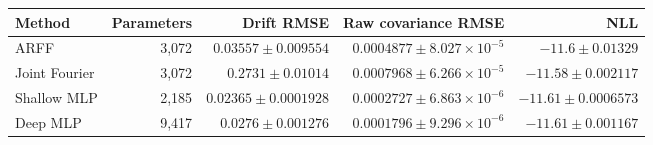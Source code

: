 \begin{tabular}{lrrrr}\toprule Method & Parameters & Drift RMSE & Raw covariance RMSE & NLL\\\midrule
ARFF & 3,072 & $0.03557\pm 0.009554$ & $0.0004877\pm 8.027\times10^{-5}$ & $-11.6\pm 0.01329$\\
Joint Fourier & 3,072 & $0.2731\pm 0.01014$ & $0.0007968\pm 6.266\times10^{-5}$ & $-11.58\pm 0.002117$\\
Shallow MLP & 2,185 & $0.02365\pm 0.0001928$ & $0.0002727\pm 6.863\times10^{-6}$ & $-11.61\pm 0.0006573$\\
Deep MLP & 9,417 & $0.0276\pm 0.001276$ & $0.0001796\pm 9.296\times10^{-6}$ & $-11.61\pm 0.001167$\\
\bottomrule\end{tabular}

